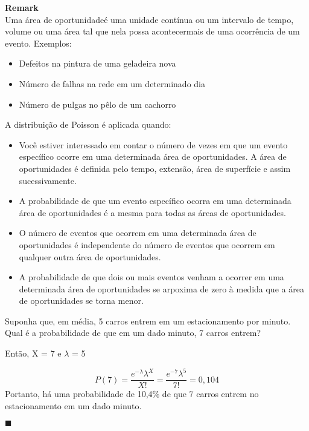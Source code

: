 \documentclass[10pt,a4paper]{article}
\begin{document}
\begin{mdframed}[linewidth=0.6pt]
\textbf{Remark}\\
	Uma área de oportunidadeé uma unidade contínua ou um intervalo de tempo, volume ou uma área tal que nela possa acontecermais de uma ocorrência de um evento. Exemplos:
	\begin{itemize}
		\item Defeitos na pintura de uma geladeira nova
		\item Número de falhas na rede em um determinado dia
		\item Número de pulgas no pêlo de um cachorro\\
	\end{itemize}
	A distribuição de Poisson é aplicada quando:
	\begin{itemize}  
		\item Você estiver interessado em contar o número de vezes em que um 
evento específico ocorre em uma determinada área de oportunidades. A área de oportunidades é definida pelo tempo, extensão, área de superfície e assim sucessivamente.
		\item A probabilidade de que um evento específico ocorra em uma 
determinada área de oportunidades é a mesma para todas as áreas 
de oportunidades.
		\item O número de eventos que ocorrem em uma determinada área de oportunidades é independente do número de eventos que ocorrem em qualquer outra área de oportunidades.
		\item A probabilidade de que dois ou mais eventos venham a ocorrer em uma determinada área de oportunidades se arpoxima de zero à medida que a área de oportunidades se torna menor.
	\end{itemize}

\end{mdframed}

\begin{eg}
	Suponha que, em média, 5 carros entrem em um estacionamento por minuto. Qual é a probabilidade de que em um dado minuto, 7 carros entrem?
\end{eg}
\begin{sol}
	Então, X = 7 e $\lambda$ = 5
	
	\[
		P(7) = \frac{e^{-\lambda}\lambda^{X}}{X!}	= \frac{e^{-7}\lambda^{5}}{7!} = 0,104
	\]	
	Portanto, há uma probabilidade de 10,4\% de que 7 carros entrem no estacionamento em um dado minuto.
\begin{flushright}
$\blacksquare$
\end{flushright}
\end{sol}
\end{document}
